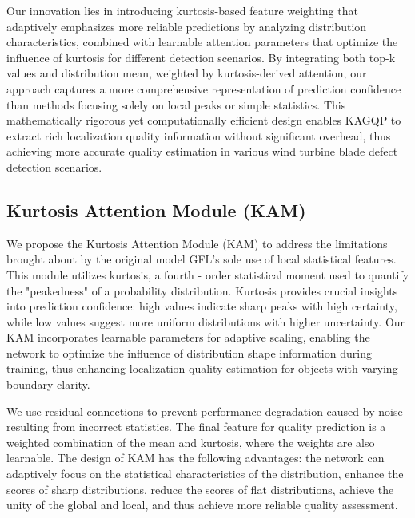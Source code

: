 Our innovation lies in introducing kurtosis-based feature weighting that adaptively emphasizes more reliable predictions by analyzing distribution characteristics, combined with learnable attention parameters that optimize the influence of kurtosis for different detection scenarios. By integrating both top-k values and distribution mean, weighted by kurtosis-derived attention, our approach captures a more comprehensive representation of prediction confidence than methods focusing solely on local peaks or simple statistics. This mathematically rigorous yet computationally efficient design enables KAGQP to extract rich localization quality information without significant overhead, thus achieving more accurate quality estimation in various wind turbine blade defect detection scenarios.

\subsection{Kurtosis Attention Module (KAM)}
We propose the Kurtosis Attention Module (KAM) to address the limitations brought about by the original model GFL's sole use of local statistical features. This module utilizes kurtosis, a fourth - order statistical moment used to quantify the "peakedness" of a probability distribution. Kurtosis provides crucial insights into prediction confidence: high values indicate sharp peaks with high certainty, while low values suggest more uniform distributions with higher uncertainty. Our KAM incorporates learnable parameters for adaptive scaling, enabling the network to optimize the influence of distribution shape information during training, thus enhancing localization quality estimation for objects with varying boundary clarity.

We use residual connections to prevent performance degradation caused by noise resulting from incorrect statistics. The final feature for quality prediction is a weighted combination of the mean and kurtosis, where the weights are also learnable. The design of KAM has the following advantages: the network can adaptively focus on the statistical characteristics of the distribution, enhance the scores of sharp distributions, reduce the scores of flat distributions, achieve the unity of the global and local, and thus achieve more reliable quality assessment.

